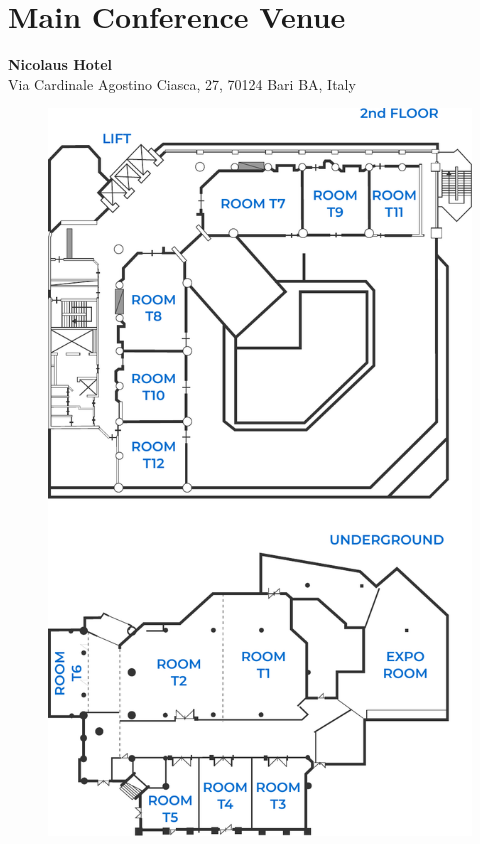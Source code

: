\documentclass[
	openany, %
	parskip=full, %
	12pt, %
	a4paper, %
]{conferencebooklet} %
\begin{document}
\chapter{Main Conference Venue}

\large \textbf{Nicolaus Hotel} \normalsize \\
 Via Cardinale Agostino Ciasca, 27, 70124 Bari BA, Italy

\begin{figure}[h!]
    \centering
    \includegraphics[width=0.71\linewidth]{maps/planimetria-completa.pdf}
\end{figure}


\end{document}
